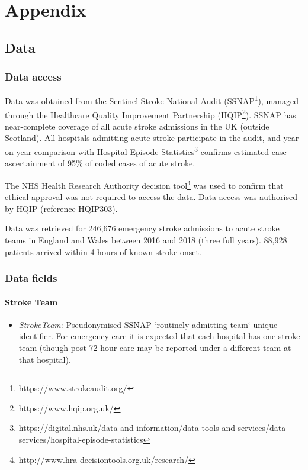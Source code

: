 \appendix
\section{Appendix}

\doclicenseThis

\subsection{Data}

\subsubsection{Data access}

Data was obtained from the Sentinel Stroke National Audit (SSNAP\footnote{https://www.strokeaudit.org/}), managed through the Healthcare Quality Improvement Partnership (HQIP\footnote{https://www.hqip.org.uk/}). SSNAP has near-complete coverage of all acute stroke admissions in the UK (outside Scotland). All hospitals admitting acute stroke participate in the audit, and year-on-year comparison with Hospital Episode Statistics\footnote{https://digital.nhs.uk/data-and-information/data-tools-and-services/data-services/hospital-episode-statistics} confirms estimated case ascertainment of 95\% of coded cases of acute stroke.

The NHS Health Research Authority decision tool\footnote{http://www.hra-decisiontools.org.uk/research/} was used to confirm that ethical approval was not required to access the data. Data access was authorised by HQIP (reference HQIP303). 

Data was retrieved for 246,676 emergency stroke admissions to acute stroke teams in England and Wales between 2016 and 2018 (three full years). 88,928 patients arrived within 4 hours of known stroke onset.

\subsubsection{Data fields}

\paragraph{Stroke Team}

\begin{itemize}
\item \emph{StrokeTeam}: Pseudonymised SSNAP `routinely admitting team` unique
  identifier. For emergency care it is expected that each hospital has
  one stroke team (though post-72 hour care may be reported under a
  different team at that hospital).
\end{itemize}

